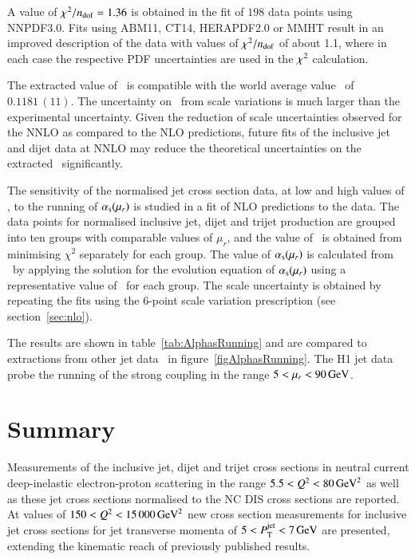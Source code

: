 \documentclass[12pt]{article}
\begin{document}
A value of $\chi^2/\ndf = 1.36$ is obtained in the fit of $198$ data points using NNPDF3.0. 
Fits using ABM11, CT14, HERAPDF2.0 or MMHT result in an improved description of the data with values of $\chi^2/\ndf$ of about 1.1, where in each case the respective PDF uncertainties are used in the $\chisq$ calculation.

The extracted value of \asmz\ is compatible with the world average value~\cite{Bethke2016} of $0.1181\,(11)$.
The uncertainty on \asmz\ from scale variations is much larger than
the experimental uncertainty.
Given the reduction of scale uncertainties observed for the NNLO
as compared to the NLO predictions, future fits of the
inclusive jet and dijet data at NNLO may reduce the theoretical
uncertainties on the extracted \asmz\ significantly.

The sensitivity of the normalised jet cross section data, at low and high values of \Qsq, to the 
running of $\alpha_{\rm s}(\mu_r)$ is studied in a fit of NLO predictions to the data.
The data points for normalised inclusive jet, dijet and trijet production are grouped into ten groups with
comparable values of $\mu_r$, and the value of \asmz\ is obtained from minimising $\chi^2$ separately for each group.
The value of $\alpha_{\rm s}(\mu_r)$ is calculated from \asmz\ by applying the solution for
the evolution equation of $\alpha_{\rm s}(\mu_r)$ using a representative value of \mur\ for each group.
The scale uncertainty is obtained by repeating the fits 
using the 6-point scale variation prescription (see section~\ref{sec:nlo}).

The results are shown in table~\ref{tab:AlphasRunning} and are compared to extractions from other jet data~\cite{zeusgp,aleph,jade,opal,cmsIncJet8TeV,d0} in figure~\ref{figAlphasRunning}.
The H1 jet data probe the running of the strong coupling in the range $5 < \mu_r < 90\,\GeV$.





\section{Summary}
\label{sect:Conclusion}
Measurements of the inclusive jet, dijet and trijet cross sections
in neutral current deep-inelastic electron-proton scattering in the
range $5.5<\Qsq<80\,\GeVsq$ 
as well as these jet cross sections normalised to the NC DIS cross sections are reported.
At values of $150<\Qsq<15\,000\,\GeVsq$ new cross section measurements for inclusive jet cross sections for jet transverse momenta of $5<\ptjet<7\,\GeV$ are presented, extending the kinematic reach of previously published results.
\end{document}

